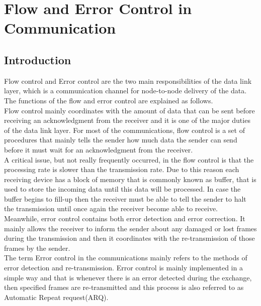 \section{Flow and Error Control in Communication}

\subsection{Introduction}
Flow control and Error control are the two main responsibilities of the data link layer, which is a communication channel for node-to-node delivery of the data. The functions of the flow and error control are explained as follows.\\

Flow control mainly coordinates with the amount of data that can be sent before receiving an acknowledgment from the receiver and it is one of the major duties of the data link layer. For most of the communications, flow control is a set of procedures that mainly tells the sender how much data the sender can send before it must wait for an acknowledgment from the receiver.\\

A critical issue, but not really frequently occurred, in the flow control is that the processing rate is slower than the transmission rate. Due to this reason each receiving device has a block of memory that is commonly known as buffer, that is used to store the incoming data until this data will be processed. In case the buffer begins to fill-up then the receiver must be able to tell the sender to halt the transmission until once again the receiver become able to receive.\\

Meanwhile, error control contains both error detection and error correction. It mainly allows the receiver to inform the sender about any damaged or lost frames during the transmission and then it coordinates with the re-transmission of those frames by the sender.\\

The term Error control in the communications mainly refers to the methods of error detection and re-transmission. Error control is mainly implemented in a simple way and that is whenever there is an error detected during the exchange, then specified frames are re-transmitted and this process is also referred to as Automatic Repeat request(ARQ).\\

